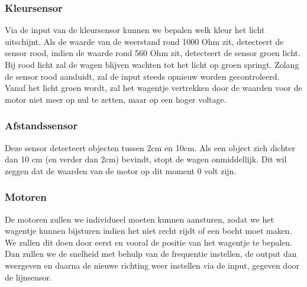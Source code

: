 \documentclass[kulak]{kulakarticle} %
\begin{document}
\subsubsection{Kleursensor}
Via de input van de kleursensor kunnen we bepalen welk kleur het licht uitschijnt. Als de waarde van de weerstand rond 1000 Ohm zit, detecteert de sensor rood, indien de waarde rond 560 Ohm zit, detecteert de sensor groen licht. Bij rood licht zal de wagen blijven wachten tot het licht op groen springt. Zolang de sensor rood aanduidt, zal de input steeds opnieuw worden gecontroleerd. Vanaf het licht groen wordt, zal het wagentje vertrekken door de waarden voor de motor niet meer op nul te zetten, maar op een hoger voltage.
\subsubsection{Afstandssensor}
Deze sensor detecteert objecten tussen 2cm en 10cm. Als een object zich dichter dan 10 cm (en verder dan 2cm) bevindt, stopt de wagen onmiddellijk. Dit wil zeggen dat de waarden van de motor op dit moment 0 volt zijn.
\subsubsection{Motoren}
De motoren zullen we individueel moeten kunnen aansturen, zodat we het wagentje  kunnen bijsturen indien het niet recht rijdt of een bocht moet maken. We zullen dit doen door eerst en vooral de positie van het wagentje te bepalen. Dan zullen we de snelheid met behulp van de frequentie instellen, de output dan weergeven en daarna de nieuwe richting weer instellen via de input, gegeven door de lijnsensor. 
\end{document}
